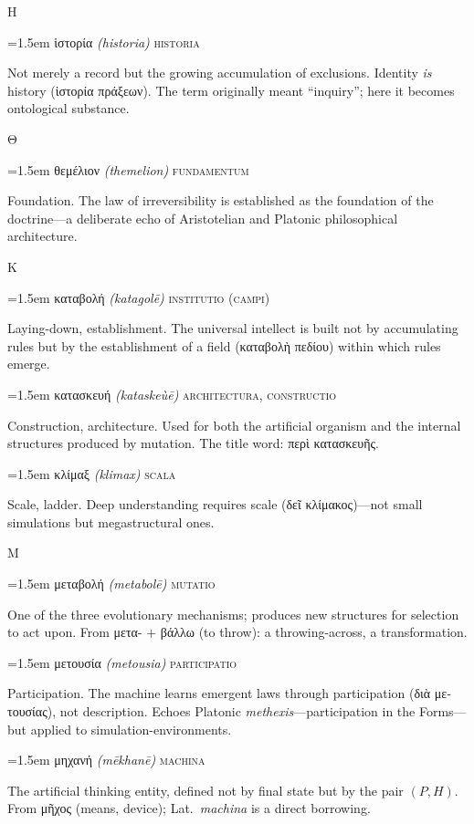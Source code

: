 \documentclass[12pt, oneside, openany]{memoir}
\newcommand{\gk}[1]{\textgreek{#1}}
\newcommand{\gkblue}[1]{{\color{greekblue}\textgreek{#1}}}
\newcommand{\gentry}[4]{%
  \noindent\hangindent=1.5em
  {\gkblue{#1}}\enspace
  {\itshape(#2)}\enspace
  {\color{rubricate}\textperiodcentered}\enspace
  {\scshape #3}\par
  \hspace*{1.5em}%
  \parbox[t]{\dimexpr\linewidth-1.5em\relax}{\strut#4\strut}%
  \par\addvspace{6pt}}
\begin{document}
\bigskip
{\centering\color{rubricate}\large\scshape Η \par}\medskip

\gentry{ἱστορία}{historia}{historia}
{Not merely a record but the growing accumulation of exclusions. Identity \emph{is} history (\gk{ἱστορία πράξεων}). The term originally meant ``inquiry''; here it becomes ontological substance.}

\bigskip
{\centering\color{rubricate}\large\scshape Θ \par}\medskip

\gentry{θεμέλιον}{themelion}{fundamentum}
{Foundation. The law of irreversibility is established as the foundation of the doctrine---a deliberate echo of Aristotelian and Platonic philosophical architecture.}

\bigskip
{\centering\color{rubricate}\large\scshape Κ \par}\medskip

\gentry{καταβολή}{katagol\={e}}{institutio (campi)}
{Laying-down, establishment. The universal intellect is built not by accumulating rules but by the establishment of a field (\gk{καταβολὴ πεδίου}) within which rules emerge.}

\gentry{κατασκευή}{kataskeù\={e}}{architectura, constructio}
{Construction, architecture. Used for both the artificial organism and the internal structures produced by mutation. The title word: \gk{περὶ κατασκευῆς}.}

\gentry{κλίμαξ}{klimax}{scala}
{Scale, ladder. Deep understanding requires scale (\gk{δεῖ κλίμακος})---not small simulations but megastructural ones.}

\bigskip
{\centering\color{rubricate}\large\scshape Μ \par}\medskip

\gentry{μεταβολή}{metabol\={e}}{mutatio}
{One of the three evolutionary mechanisms; produces new structures for selection to act upon. From \gk{μετα-} + \gk{βάλλω} (to throw): a throwing-across, a transformation.}

\gentry{μετουσία}{metousia}{participatio}
{Participation. The machine learns emergent laws through participation (\gk{διὰ μετουσίας}), not description. Echoes Platonic \textit{methexis}---participation in the Forms---but applied to simulation-environments.}

\gentry{μηχανή}{m\={e}khan\={e}}{machina}
{The artificial thinking entity, defined not by final state but by the pair $(P, H)$. From \gk{μῆχος} (means, device); Lat.\ \textit{machina} is a direct borrowing.}
\end{document}
